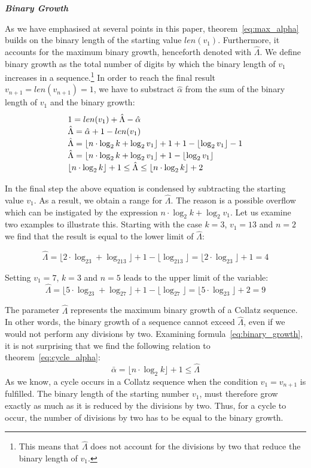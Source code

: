 \documentclass{SciPress_2015}
\renewcommand{\subsection}[1]{\textit{\textbf{#1}}}
\begin{document}
\subsection{Binary Growth}
\par\noindent
As we have emphasised at several points in this paper, theorem~\ref{eq:max_alpha} builds on the binary length of the starting value $len(v_1)$. Furthermore, it accounts for the maximum binary growth, henceforth denoted with $\hat\Lambda$. We define binary growth as the total number of digits by which the binary length of $v_1$ increases in a sequence.\footnote{This means that $\hat\Lambda$ does not account for the divisions by two that reduce the binary length of $v_1$.} In order to reach the final result $v_{n+1}=len(v_{n+1})=1$, we have to substract $\hat\alpha$ from the sum of the binary length of $v_1$ and the binary growth:
\begin{equation}
\label{eq:binary_growth}
\def\arraystretch{1.2}\begin{array}{l}
1=len(v_1)+\hat\Lambda-\hat\alpha\\
\hat\Lambda=\hat\alpha+1-len(v_1)\\
\hat\Lambda=\lfloor n\cdot\log_2k+\log_2v_1\rfloor+1+1-\lfloor\log_2v_1\rfloor-1\\
\hat\Lambda=\lfloor n\cdot\log_2k+\log_2v_1\rfloor+1-\lfloor\log_2v_1\rfloor\\
\lfloor n\cdot\log_2k\rfloor+1\le\hat\Lambda\le\lfloor n\cdot\log_2k\rfloor+2
\end{array}
\end{equation}

In the final step the above equation is condensed by subtracting the starting value $v_1$. As a result, we obtain a range for $\hat\Lambda$. The reason is a possible overflow which can be instigated by the expression $n\cdot\log_2k+\log_2v_1$. Let us examine two examples to illustrate this. Starting with the case $k=3$, $v_1=13$ and $n=2$ we find that the result is equal to the lower limit of $\hat\Lambda$:

\[
\hat\Lambda=\lfloor2\cdot\log_23+\log_213\rfloor+1-\lfloor\log_213\rfloor=\lfloor2\cdot\log_23\rfloor+1=4
\]

\par\medskip
Setting $v_1=7$, $k=3$ and $n=5$ leads to the upper limit of the variable:
\[
\hat\Lambda=\lfloor5\cdot\log_23+\log_27\rfloor+1-\lfloor\log_27\rfloor=\lfloor5\cdot\log_23\rfloor+2=9
\]

The parameter $\hat\Lambda$ represents the maximum binary growth of a Collatz sequence. In other words, the binary growth of a sequence cannot exceed $\hat\Lambda$, even if we would not perform any divisions by two. Examining formula~\ref{eq:binary_growth}, it is not surprising that we find the following relation to theorem~\ref{eq:cycle_alpha}:
\[
\bar\alpha=\lfloor n\cdot\log_2k\rfloor+1\le\hat\Lambda
\]
As we know, a cycle occurs in a Collatz sequence when the condition $v_1=v_{n+1}$ is fulfilled. The binary length of the starting number $v_1$, must therefore grow exactly as much as it is reduced by the divisions by two. Thus, for a cycle to occur, the number of divisions by two has to be equal to the binary growth.
\end{document}
